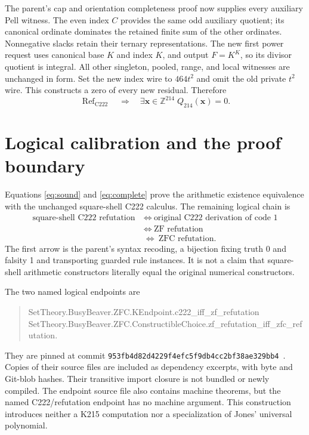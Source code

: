 \documentclass[11pt,a4paper]{article}
\theoremstyle{definition}
\newcommand{\Z}{\mathbb Z}
\newcommand{\Crefut}{\operatorname{Ref}_{\mathrm{C222}}}
\newcommand{\Qdiag}{Q_{214}}
\begin{document}
The parent's cap and orientation completeness proof now supplies every
auxiliary Pell witness. The even index $C$ provides the same odd
auxiliary quotient; its canonical ordinate dominates the retained finite
sum of the other ordinates. Nonnegative slacks retain their ternary
representations. The new first power request uses canonical base $K$
and index $K$, and output $F=K^K$, so its divisor quotient is integral.
All other singleton, pooled, range, and local witnesses are unchanged
in form. Set the new index wire to $464t^2$ and omit the old private
$t^2$ wire. This constructs a zero of every new residual. Therefore
\begin{equation}\label{eq:complete}
 \Crefut\quad\Longrightarrow\quad
 \exists\mathbf x\in\Z^{214}\;\Qdiag(\mathbf x)=0.
\end{equation}

\section{Logical calibration and the proof boundary}\label{sec:boundary}

Equations \eqref{eq:sound} and \eqref{eq:complete} prove the arithmetic
existence equivalence with the unchanged square-shell C222 calculus.
The remaining logical chain is
\begin{align*}
 \text{square-shell C222 refutation}
 &\ \Longleftrightarrow\ \text{original C222 derivation of code 1}\\
 &\ \Longleftrightarrow\ \text{ZF refutation}\\
 &\ \Longleftrightarrow\ \text{ZFC refutation}.
\end{align*}
The first arrow is the parent's syntax recoding, a bijection fixing truth
0 and falsity 1 and transporting guarded rule instances. It is not a
claim that square-shell arithmetic constructors literally equal the
original numerical constructors.

The two named logical endpoints are
\begin{quote}\small\ttfamily
SetTheory.BusyBeaver.ZFC.KEndpoint.\allowbreak c222\_iff\_zf\_refutation\\
SetTheory.BusyBeaver.ZFC.ConstructibleChoice.\allowbreak zf\_refutation\_iff\_zfc\_refutation.
\end{quote}
They are pinned at commit
\texttt{953fb4d82d4229f4efc5f9db4cc2bf38ae329bb4}~\cite{kend,choice}.
Copies of their source files are included as dependency excerpts, with
byte and Git-blob hashes. Their transitive import closure is not bundled
or newly compiled. The endpoint source file also contains machine
theorems, but the named C222/refutation endpoint has no machine argument.
This construction introduces neither a K215 computation nor a
specialization of Jones' universal polynomial.
\end{document}
